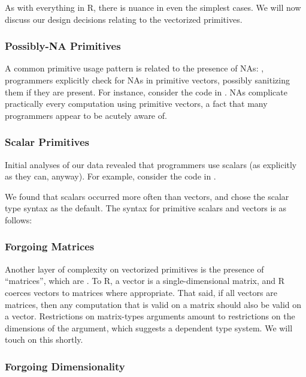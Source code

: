 \documentclass[acmsmall,review,anonymous]{acmart}\settopmatter{printfolios=true,printccs=false,printacmref=false}
\begin{document}
As with everything in R, there is nuance in even the simplest cases.
We will now discuss our design decisions relating to the vectorized primitives.

%
%
\subsubsection{Possibly-NA Primitives}

A common primitive usage pattern is related to the presence of NAs: , programmers explicitly check for NAs in primitive vectors, possibly sanitizing them if they are present.
For instance, consider the code in .
NAs complicate practically every computation using primitive vectors, a fact that many programmers appear to be acutely aware of.

%
%
\subsubsection{Scalar Primitives}

Initial analyses of our data revealed that programmers  use scalars (as explicitly as they can, anyway).
For example, consider the code in .

We found that scalars occurred more often than vectors, and chose the scalar type syntax as the default.
The syntax for primitive scalars and vectors is as follows:

 
%
%
\subsubsection{Forgoing Matrices}

Another layer of complexity on vectorized primitives is the presence of ``matrices'', which are .
To R, a vector is a single-dimensional matrix, and R coerces vectors to matrices where appropriate.
That said, if all vectors are matrices, then any computation that is valid on a matrix should also be valid on a vector.
Restrictions on matrix-types arguments amount to restrictions on the dimensions of the argument, which suggests a dependent type system.
We will touch on this shortly.
 
%
%
\subsubsection{Forgoing Dimensionality} 
\end{document}

